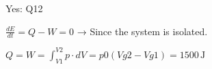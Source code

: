 Yes: Q12  

\( \frac{dE}{dt} = Q - W = 0 \) → Since the system is isolated.  

\( Q = W = \int_{V1}^{V2} p \cdot dV = p0(Vg2 - Vg1) = 1500 \, \text{J} \)